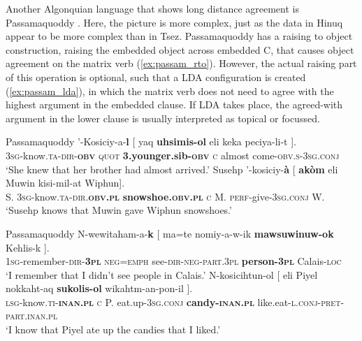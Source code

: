 \documentclass[output=paper
,modfonts
,nonflat]{langsci/langscibook}
\begin{document}
Another Algonquian language that shows long distance agreement is Passamaquoddy \citep{Bruening2001a}. Here, the picture is more complex, just as the data in Hinuq appear to be more complex than in Tsez. Passamaquoddy has a raising to object construction, raising the embedded object across embedded C, that causes object agreement on the matrix verb (\ref{ex:passam_rto}). However, the actual raising part of this operation is optional, such that a LDA configuration is created (\ref{ex:passam_lda}), in which the matrix verb does not need to agree with the highest argument in the embedded clause. If LDA takes place, the agreed-with argument in the lower clause is usually interpreted as topical or focussed.
\begin{exe}
\ex Passamaquoddy \citep[][258]{Bruening2001a}\label{ex:passam_rto}
	\xlist
	\ex	
		\gll '-Kosiciy-a-\textbf{l} [ yaq \textbf{uhsimis-ol} eli keka peciya-li-t ].\\
			 \textsc{3sg}-know.\textsc{ta-dir-\textbf{obv}} {} \textsc{quot} \textbf{3.younger.sib-\textsc{obv}} \textsc{c} almost come-\textsc{obv.s-3sg.conj}\\
		\glt `She knew that her brother had almost arrived.'
	\ex 
		\gll Susehp '-kosiciy-\textbf{\`{a}} [ \textbf{ak\`{o}m} eli Muwin kisi-mil-at Wiphun].\\
			 S. \textsc{3sg}-know.\textsc{ta-dir.\textbf{obv.pl}} {} \textbf{snowshoe.\textsc{obv.pl}} \textsc{c} M. \textsc{perf}-give-\textsc{3sg.conj} W.\\
		\glt `Susehp knows that Muwin gave Wiphun snowshoes.'
	\endxlist
\end{exe}
\begin{exe}
\ex Passamaquoddy \citep[][259]{Bruening2001a}\label{ex:passam_lda}
	\xlist
	\ex	\label{ex:passam_ti_lda}
		\gll N-wewitaham-a-\textbf{k} [ ma=te nomiy-a-w-ik \textbf{mawsuwinuw-ok} Kehlis-k ].\\
			 \textsc{1sg}-remember-\textsc{dir-\textbf{3pl}} {} \textsc{neg=emph} see-\textsc{dir-neg-part.3pl} \textbf{person-\textsc{3pl}} Calais-\textsc{loc} {}\\
		\glt `I remember that I didn't see people in Calais.'
	\ex
		\gll N-kosicihtun-ol [ eli Piyel nokkaht-aq \textbf{sukolis-ol} wikahtm-an-pon-il ].\\
			 \textsc{lsg}-know.\textsc{ti-\textbf{inan.pl}} {} \textsc{c} P. eat.up-\textsc{3sg.conj} \textbf{candy-\textsc{inan.pl}} like.eat-\textsc{l.conj-pret-part.inan.pl}\\
		\glt `I know that Piyel ate up the candies that I liked.'
	\endxlist
\end{exe}
\end{document}
